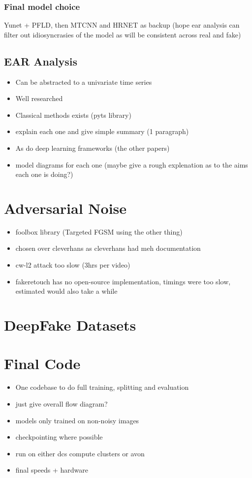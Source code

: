 \subsubsection{Final model choice}

Yunet + PFLD, then MTCNN and HRNET as backup (hope ear analysis can filter out idiosyncrasies of the model as will be consistent across real and fake)

\subsection{EAR Analysis}

\begin{itemize}
    \item Can be abstracted to a univariate time series
    \item Well researched
    \item Classical methods exists (pyts library)
    \item explain each one and give simple summary (1 paragraph)
    \item As do deep learning frameworks (the other papers)
    \item model diagrams for each one (maybe give a rough explenation as to the aims each one is doing?)
\end{itemize}

\section{Adversarial Noise}

\begin{itemize}
    \item foolbox library (Targeted FGSM using the other thing)
    \item chosen over cleverhans as cleverhans had meh documentation
    \item cw-l2 attack too slow (3hrs per video)
    \item fakeretouch has no open-source implementation, timings were too slow, estimated would also take a while
\end{itemize}

\section{DeepFake Datasets}
\label{sec:datasets}

\section{Final Code}

\begin{itemize}
    \item One codebase to do full training, splitting and evaluation
    \item just give overall flow diagram?
    \item {\huge models only trained on non-noisy images}
    \item checkpointing where possible
    \item run on either dcs compute clusters or avon
    \item final speeds + hardware
\end{itemize}